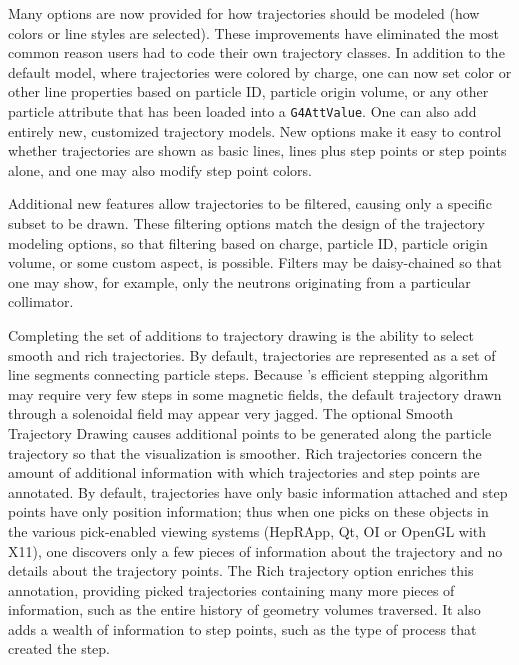 
Many options are now provided for how trajectories should be modeled (how colors
or line styles are selected).  These improvements have eliminated the most 
common reason users had to code their own trajectory classes.  In addition to 
the default model, where trajectories were colored by charge, one can now set 
color or other line properties based on particle ID, particle origin volume, or
any other particle attribute that has been loaded into a \texttt{G4AttValue}.
One can also add entirely new, customized trajectory models.  New options make
it easy to control whether trajectories are shown as basic lines, lines plus
step points or step points alone, and one may also modify step point colors.

Additional new features allow trajectories to be filtered, causing only a 
specific subset to be drawn.  These filtering options match the design of the 
trajectory modeling options, so that filtering based on charge, particle ID, 
particle origin volume, or some custom aspect, is possible.  Filters may be
daisy-chained so that one may show, for example, only the neutrons originating
from a particular collimator.

Completing the set of additions to trajectory drawing is the ability to select
smooth and rich trajectories.  By default, trajectories are represented as a set
of line segments connecting particle steps.  Because \Gfour{}'s efficient 
stepping algorithm may require very few steps in some magnetic fields, the 
default trajectory drawn through a solenoidal field may appear very jagged.  The
optional Smooth Trajectory Drawing causes additional points to be generated
along the particle trajectory so that the visualization is smoother.  Rich 
trajectories concern the amount of additional information with which 
trajectories and step points are annotated.  By default, trajectories have only 
basic information attached and step points have only position information; thus 
when one picks on these objects in the various pick-enabled viewing systems 
(HepRApp, Qt, OI or OpenGL with X11), one discovers only a few pieces of 
information about the trajectory and no details about the trajectory points.  
The Rich trajectory option enriches this annotation, providing picked 
trajectories containing many more pieces of information, such as the entire 
history of geometry volumes traversed.  It also adds a wealth of information to
step points, such as the type of process that created the step.

